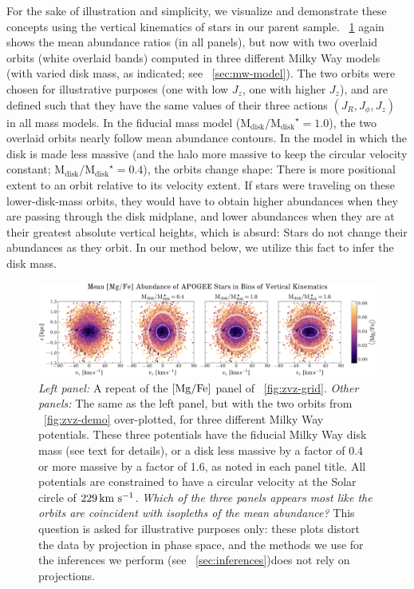 \documentclass[modern]{aastex63}
\newcommand{\mdisk}{\ensuremath{\mathrm{M}_\mathrm{disk}}}
\newcommand{\mratio}{\ensuremath{\mdisk / \mdisk^\star}}
\begin{document}
For the sake of illustration and simplicity, we visualize and demonstrate these
concepts using the vertical kinematics of stars in our parent sample.
\figurename~\ref{fig:zvz-mgfe} again shows the mean  abundance
ratios (in all panels), but now with two overlaid orbits (white overlaid bands)
computed in three different Milky Way models (with varied disk mass, as
indicated; see \sectionname~\ref{sec:mw-model}).
The two orbits were chosen for illustrative purposes (one with low $J_z$, one
with higher $J_z$), and are defined such that they have the same values of their
three actions $(J_R, J_\phi, J_z)$ in all mass models.
In the fiducial mass model ($\mratio = 1.0$), the two overlaid orbits nearly
follow mean abundance contours.
In the model in which the disk is made less massive (and the halo more massive
to keep the circular velocity constant; $\mratio = 0.4$), the orbits change
shape:
There is more positional extent to an orbit relative to its velocity extent.
If stars were traveling on these lower-disk-mass orbits, they would have to
obtain higher abundances when they are passing through the disk midplane,
and lower abundances when they are at their greatest absolute vertical heights,
which is absurd: Stars do not change their abundances as they orbit.
In our method below, we utilize this fact to infer the disk mass.


\begin{figure}[!tp]
  \begin{center}
  \includegraphics[width=\textwidth]{zvz-mean-MG_FE}
  \end{center}
  \caption{%
    \textsl{Left panel:} A repeat of the ${[\mathrm{Mg}/\mathrm{Fe}]}$ panel of
    \figurename~\ref{fig:zvz-grid}.
    \textsl{Other panels:} The same as the left panel, but with the two orbits
    from \figurename~\ref{fig:zvz-demo} over-plotted, for three different Milky
    Way potentials.
    These three potentials have the fiducial Milky Way disk mass (see text
    for details), or a disk less massive by a factor of 0.4 or more
    massive by a factor of 1.6, as noted in each panel title.
    All potentials are constrained to have a circular velocity at the
    Solar circle of $229\,\mathrm{km}~\mathrm{s}^{-1}$.
    \emph{Which of the three panels appears most like the orbits are
    coincident with isopleths of the mean abundance?}
    This question is asked for illustrative purposes only: these plots distort
    the data by projection in phase space, and the methods we use for the
    inferences we perform (see \sectionname~\ref{sec:inferences})does not rely
    on projections.
  \label{fig:zvz-mgfe}
  }
\end{figure}
\end{document}

